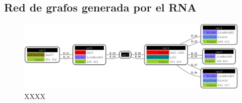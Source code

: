 \subsection{Red de grafos generada por el RNA}

 \lipsum[1]

\begin{figure}[H]
	\centering
	\includegraphics[width=1\textwidth]{Figuras/Graph_2}
	\centering\caption{XXXX}
\end{figure}

\lipsum[1]